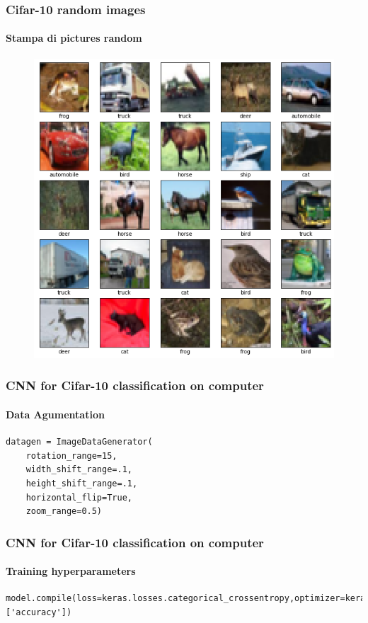 \documentclass{beamer}
\begin{document}
\begin{frame}[fragile]
\frametitle{Cifar-10 random images}
\framesubtitle{Stampa di pictures random}
\begin{figure}
	\centering
	\includegraphics[scale=0.35]{pictures/index}
\end{figure}
\end{frame}

\begin{frame}[fragile]
\frametitle{CNN for Cifar-10 classification on computer}
\framesubtitle{Data Agumentation}
\begin{lstlisting}
datagen = ImageDataGenerator(
	rotation_range=15,
	width_shift_range=.1,
	height_shift_range=.1,
	horizontal_flip=True,
	zoom_range=0.5)
\end{lstlisting}
\end{frame}

\begin{frame}[fragile]
\frametitle{CNN for Cifar-10 classification on computer}
\framesubtitle{Training hyperparameters}
	\begin{lstlisting}
model.compile(loss=keras.losses.categorical_crossentropy,optimizer=keras.optimizers.Adam(),metrics=['accuracy'])
	\end{lstlisting}
\end{frame}
\end{document}
